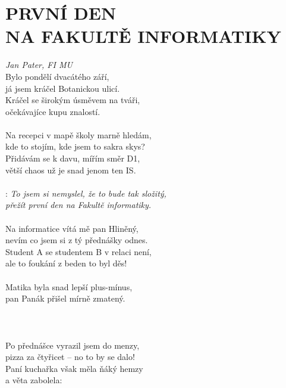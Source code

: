\section*{\Huge PRVNÍ DEN\\NA FAKULTĚ INFORMATIKY}
\emph{Jan Pater, FI MU}\\

Bylo pondělí dvacátého září,\\
já jsem kráčel Botanickou ulicí.\\
Kráčel se širokým úsměvem na tváři,\\
očekávajíce kupu znalostí.\\
\\
Na recepci v mapě školy marně hledám,\\
kde to stojím, kde jsem to sakra skys?\\
Přidávám se k davu, mířím směr D1,\\
větší chaos už je snad jenom ten IS.\\
\\
\textregistered:
\emph{To jsem si nemyslel, že to bude tak složitý,\\
přežít první den na Fakultě informatiky.}\\
\\
Na informatice vítá mě pan Hliněný,\\
nevím co jsem si z tý přednášky odnes.\\
Student A se studentem B v relaci není,\\
ale to foukání z beden to byl děs!\\
\\
Matika byla snad lepší plus-mínus,\\
pan Panák přišel mírně zmatený.\\
\\
\hspace{1cm}\textregistered\\
\\
Po přednášce vyrazil jsem do menzy,\\
pizza za čtyřicet -- no to by se dalo!\\
Paní kuchařka však měla ňáký hemzy\\
a věta zabolela: \\

